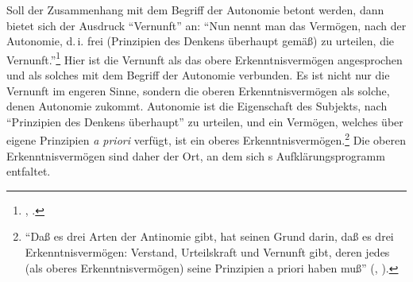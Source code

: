 Soll der Zusammenhang mit dem Begriff der Autonomie betont werden, dann bietet
sich der Ausdruck \enquote{Vernunft} an: \enquote{Nun nennt man das Vermögen,
nach der Autonomie, d.\,i. frei (Prinzipien des Denkens überhaupt gemäß) zu
urteilen, die Vernunft.}\footnote{\cite[][A 25]{Kant:DerStreitderFakultaeten1977},
\cite[][VII: 27.30--32]{Kant:GesammelteWerke1900ff.}.} Hier ist die Vernunft als
das obere Erkenntnisvermögen angesprochen und als solches mit dem Begriff der
Autonomie verbunden. Es ist nicht nur die Vernunft im engeren Sinne, sondern die
oberen Erkenntnisvermögen als solche, denen Autonomie zukommt. Autonomie
ist die Eigenschaft des Subjekts, nach \enquote{Prinzipien des Denkens
überhaupt} zu urteilen, und ein Vermögen, welches über eigene Prinzipien
\emph{a priori} verfügt, ist ein oberes
Erkenntnisvermögen.\footnote{\enquote{Daß es drei Arten der Antinomie gibt, hat
seinen Grund darin, daß es drei Erkenntnisvermögen: Verstand, Urteilskraft und
Vernunft gibt, deren jedes (als oberes Erkenntnisvermögen) seine Prinzipien a
priori haben muß} \mkbibparens{\cite[][B 243]{Kant:KritikderUrteilskraft2009},
\cite[][V: 345.3--6]{Kant:GesammelteWerke1900ff.}}.} Die oberen
Erkenntnisvermögen sind daher der Ort, an dem sich s
Aufklärungsprogramm entfaltet.

